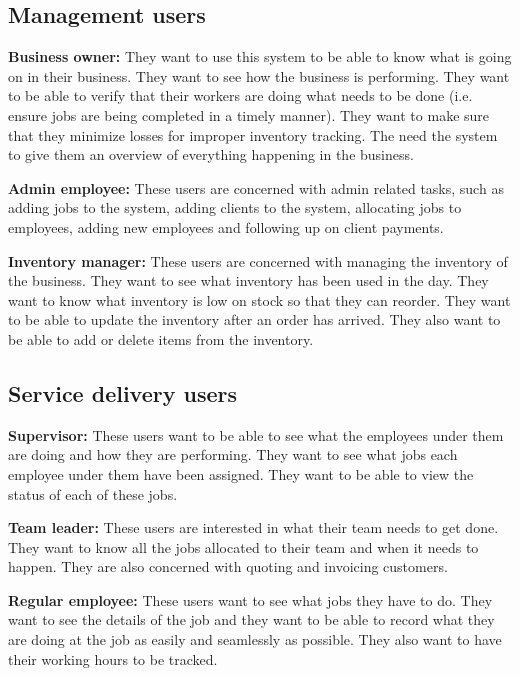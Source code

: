\documentclass{article}
\begin{document}
	\subsection*{Management users}
	\begin{list}{.}{}
		\item \textbf{Business owner:} They want to use this system to be able to know what is going on in their business. They want to see how the business is performing. They want to be able to verify that their workers are doing what needs to be done (i.e. ensure jobs are being completed in a timely manner). They want to make sure that they minimize losses for improper inventory tracking. The need the system to give them an overview of everything happening in the business.
		\item \textbf{Admin employee:} These users are concerned with admin related tasks, such as adding jobs to the system, adding clients to the system, allocating jobs to employees, adding new employees and following up on client payments.
		\item \textbf{Inventory manager:} These users are concerned with managing the inventory of the business. They want to see what inventory has been used in the day. They want to know what inventory is low on stock so that they can reorder. They want to be able to update the inventory after an order has arrived. They also want to be able to add or delete items from the inventory. 
	\end{list}
	
	\subsection*{Service delivery users}
	\begin{list}{.}{}
		\item \textbf{Supervisor:} These users want to be able to see what the employees under them are doing and how they are performing. They want to see what jobs each employee under them have been assigned. They want to be able to view the status of each of these jobs. 
		\item \textbf{Team leader:} These users are interested in what their team needs to get done. They want to know all the jobs allocated to their team and when it needs to happen. They are also concerned with quoting and invoicing customers.
		\item \textbf{Regular employee:} These users want to see what jobs they have to do. They want to see the details of the job and they want to be able to record what they are doing at the job as easily and seamlessly as possible. They also want to have their working hours to be tracked.
	\end{list}
	
\end{document}
